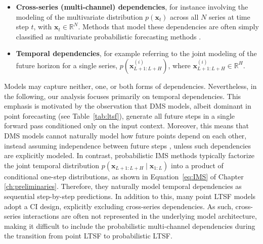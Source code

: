 \documentclass[a4paper,oneside,bibliography=totoc]{scrbook}
\begin{document}
\begin{itemize}
    \item \textbf{Cross-series (multi-channel) dependencies}, for instance involving the modeling of the multivariate distribution $p(\mathbf{x}_t)$ across all $N$ series at time step $t$, with $\mathbf{x}_t \in \mathbb{R}^N$. Methods that model these dependencies are often simply classified as multivariate probabilistic forecasting methods \cite{benidis_deep_2022}. 
    \item \textbf{Temporal dependencies}, for example referring to the joint modeling of the future horizon for a single series, $p(\mathbf{x}^{(i)}_{L+1:L+H})$, where $\mathbf{x}^{(i)}_{L+1:L+H} \in \mathbb{R}^H$.
\end{itemize}
Models may capture neither, one, or both forms of dependencies. 
Nevertheless, in the following, our analysis focuses primarily on temporal dependencies.
This emphasis is motivated by the observation that DMS models, albeit dominant in point forecasting (see Table~\ref{tab:ltsf}), generate all future steps in a single forward pass conditioned only on the input context.
Moreover, this means that DMS models cannot naturally model how future points depend on each other, instead assuming independence between future steps \cite{taieb_review_2012}, unless such dependencies are explicitly modeled.
In contrast, probabilistic IMS methods typically factorize the joint temporal distribution $p(\mathbf{x}_{L+1:L+H} \mid \mathbf{x}_{1:L})$ into a product of conditional one-step distributions, as shown in Equation~\ref{eq:IMS} of Chapter \ref{ch:preliminaries}.
Therefore, they naturally model temporal dependencies as sequential step-by-step predictions.
In addition to this, many point LTSF models adopt a CI design, explicitly excluding cross-series dependencies. As such, cross-series interactions are often not represented in the underlying model architecture, making it difficult to include the probabilistic multi-channel dependencies during the transition 
from point LTSF to probabilistic LTSF. 
\end{document}
